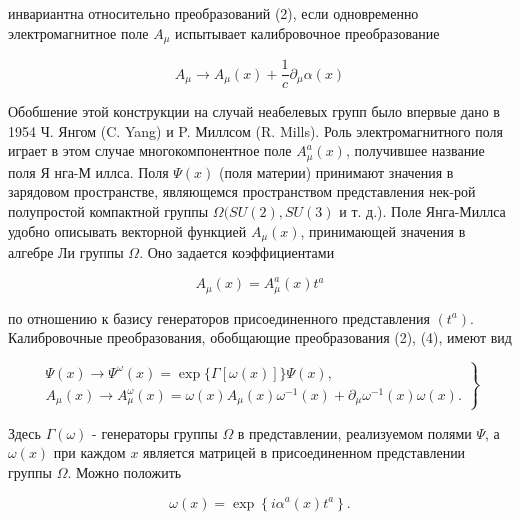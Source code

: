 \documentclass[10pt]{article}
\begin{document}
инвариантна относительно преобразований (2), если одновременно электромагнитное поле $A_{\mu}$ испытывает калибровочное преобразование



\[

A_{\mu} \rightarrow A_{\mu}(x)+\frac{1}{c} \partial_{\mu} \alpha(x)

\]



Обобшение этой конструкции на случай неабелевых групп было впервые дано в 1954 Ч. Янгом (C. Yang) и P. Миллсом (R. Mills). Роль электромагнитного поля играет в этом случае многокомпонентное поле $A_{\mu}^{a}(x)$, получившее название поля Я нга-М иллса. Поля $\Psi(x)$ (поля материи) принимают значения в зарядовом пространстве, являющемся пространством представления нек-рой полупростой компактной группы $\Omega(S U(2), S U(3)$ и т. д.). Поле Янга-Миллса удобно описывать векторной функцией $A_{\mu}(x)$, принимающей значения в алгебре Ли группы $\Omega$. Оно задается коэффициентами



\[

A_{\mu}(x)=A_{\mu}^{a}(x) t^{a}

\]



по отношению к базису генераторов присоединенного представления $\left(t^{a}\right)$. Калибровочные преобразования, обобщающие преобразования (2), (4), имеют вид



\[

\left.\begin{array}{l}

\Psi(x) \rightarrow \Psi^{\omega}(x)=\exp \{\Gamma[\omega(x)]\} \Psi(x), \\

A_{\mu}(x) \rightarrow A_{\mu}^{\omega}(x)=\omega(x) A_{\mu}(x) \omega^{-1}(x)+\partial_{\mu} \omega^{-1}(x) \omega(x) .

\end{array}\right\}

\]



Здесь $\Gamma(\omega)$ - генераторы группы $\Omega$ в представлении, реализуемом полями $\Psi$, а $\omega(x)$ при каждом $x$ является матрицей в присоединенном представлении группы $\Omega$. Можно положить



\[

\omega(x)=\exp \left\{i \alpha^{a}(x) t^{a}\right\} .

\]
\end{document}
